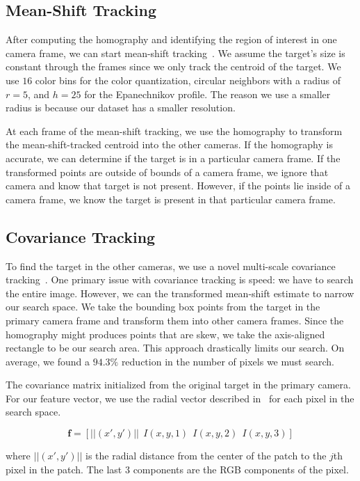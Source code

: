 \documentclass{article}
\begin{document}
\subsection{Mean-Shift Tracking}
\label{sec:meanshift}
After computing the homography and identifying the region of interest in one camera frame, we can start mean-shift tracking~\cite{comaniciu2003kernel}. We assume the target's size is constant through the frames since we only track the centroid of the target. We use $16$ color bins for the color quantization, circular neighbors with a radius of $r=5$, and $h=25$ for the Epanechnikov profile. The reason we use a smaller radius is because our dataset has a smaller resolution.

At each frame of the mean-shift tracking, we use the homography to transform the mean-shift-tracked centroid into the other cameras. If the homography is accurate, we can determine if the target is in a particular camera frame. If the transformed points are outside of bounds of a camera frame, we ignore that camera and know that target is not present. However, if the points lie inside of a camera frame, we know the target is present in that particular camera frame.

\subsection{Covariance Tracking}
\label{sec:covariance}
To find the target in the other cameras, we use a novel multi-scale covariance tracking~\cite{porikli2006covariance}. One primary issue with covariance tracking is speed: we have to search the entire image. However, we can the transformed mean-shift estimate to narrow our search space. We take the bounding box points from the target in the primary camera frame and transform them into other camera frames. Since the homography might produces points that are skew, we take the axis-aligned rectangle to be our search area. This approach drastically limits our search. On average, we found a $94.3\%$ reduction in the number of pixels we must search.

The covariance matrix initialized from the original target in the primary camera. For our feature vector, we use the radial vector described in~\cite{porikli2006covariance} for each pixel in the search space.

\[
\mathbf{f} = \left[ ||(x', y')||~~I(x,y,1)~~I(x,y,2)~~I(x,y,3)\right]
\]

where $||(x', y')||$ is the radial distance from the center of the patch to the $j$th pixel in the patch. The last $3$ components are the RGB components of the pixel.
\end{document}

